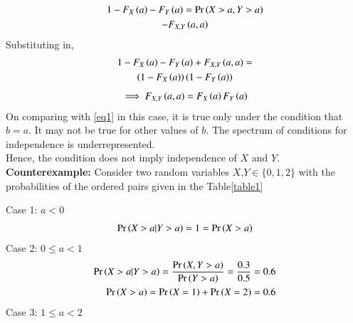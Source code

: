 \documentclass[journal,12pt,twocolumn]{IEEEtran}
\begin{document}
\begin{enumerate}
\begin{multline}
    \end{multline}
    \begin{multline}
        1-F_X\left(a\right)-F_Y\left(a\right)=\Pr\left(X>a,Y>a\right)\\-F_{X,Y}\left(a,a\right)
    \end{multline}
    Substituting in,
    \begin{multline}
        1-F_X\left(a\right)-F_Y\left(a\right)+F_{X,Y}\left(a,a\right)=\\ \left(1-F_X\left(a\right)\right)\left(1-F_Y\left(a\right)\right)
    \end{multline}
    \begin{align}
        \implies F_{X,Y}\left(a,a\right)=F_X\left(a\right)F_Y\left(a\right)
    \end{align}
    On comparing with \eqref{eq1} in this case, it is true only under the condition that $b=a$. It may not be true for other values of $b$. The spectrum of conditions for independence is underrepresented.\\ Hence, the condition does not imply independence of $X$ and $Y$.\\
    \textbf{Counterexample:} Consider two random variables $X$,$Y \in \{0,1,2\}$ with the probabilities of the ordered pairs  given in the Table\ref{table1}
    \begin{center}
    \begin{table}[H]
    \centering
    \caption{}
    \label{table1}
    \end{table}
    \end{center}
    Case 1: $a<0$
    \begin{align}
        \Pr\left(X>a|Y>a\right)=1=\Pr\left(X>a\right)
    \end{align}
    Case 2: $0\leq a <1$
    \begin{align}
        \Pr\left(X>a|Y>a\right)=\frac{\Pr\left(X,Y>a\right)}{\Pr\left(Y>a\right)}=\frac{0.3}{0.5}=0.6\\
        \Pr\left(X>a\right)=\Pr\left(X=1\right)+\Pr\left(X=2\right)=0.6
    \end{align}
    Case 3: $1\leq a <2$
    \begin{align}

\end{align}
\end{enumerate}
\end{document}
